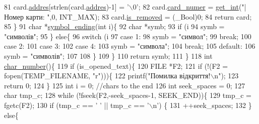 \begin{DoxyCodeInclude}
{{{{81     card.\hyperlink{structpatient__struct_a74e029a3ea6a1d9896abb9477f53dcf8}{addres}[strlen(card.\hyperlink{structpatient__struct_a74e029a3ea6a1d9896abb9477f53dcf8}{addres})-1] = \textcolor{charliteral}{'\(\backslash\)0'};
82     card.\hyperlink{structpatient__struct_a06e0e04046e9434904f4e53bb8583332}{card\_numer} = \hyperlink{lab__functions_8h_a45e2d75e7b00ac6711c815431d42bcfd}{get\_int}(\textcolor{stringliteral}{"|Номер карти: "},0, INT\_MAX);
83     card.\hyperlink{structpatient__struct_ad2475b69abfa9243c2700d63b63aa79b}{is\_removed} = (\_Bool)0;
84     \textcolor{keywordflow}{return} card;
85 \}
91 \textcolor{keywordtype}{char} *\hyperlink{main_8c_a7b977e9bdffd23deea96ed66e437ba5e}{symbol\_ending}(\textcolor{keywordtype}{int} i)\{
92     \textcolor{keywordtype}{char} *symb;
93     \textcolor{keywordflow}{if} (i%
94         symb = \textcolor{stringliteral}{"символів"};
95     \} \textcolor{keywordflow}{else}\{
96         \textcolor{keywordflow}{switch} (i%
97             \textcolor{keywordflow}{case} 1:
98                 symb = \textcolor{stringliteral}{"символ"};
99                 \textcolor{keywordflow}{break};
100             \textcolor{keywordflow}{case} 2:
101             \textcolor{keywordflow}{case} 3:
102             \textcolor{keywordflow}{case} 4:
103                 symb = \textcolor{stringliteral}{"символа"};
104                 \textcolor{keywordflow}{break};
105             \textcolor{keywordflow}{default}:
106                 symb = \textcolor{stringliteral}{"символів"};
107 
108         \}
109     \}
110     \textcolor{keywordflow}{return} symb;
111 \}
118 \textcolor{keywordtype}{int} \hyperlink{main_8c_a547313220292d7be671b208b68ab1d94}{char\_number}()\{
119     \textcolor{keywordflow}{if} (is\_opened\_text)\{
120         FILE *F2;
121         \textcolor{keywordflow}{if} (!(F2 = fopen(TEMP\_FILENAME, \textcolor{stringliteral}{"r"})))\{
122             printf(\textcolor{stringliteral}{"Помилка відкриття!\(\backslash\)n"});
123             \textcolor{keywordflow}{return} 0;
124         \}
125         \textcolor{keywordtype}{int} i = 0; \textcolor{comment}{//chars to the end}
126         \textcolor{keywordtype}{int} seek\_spaces = 0;
127         \textcolor{keywordtype}{char} tmp\_c;
128         \textcolor{keywordflow}{while} (!fseek(F2,-seek\_spaces-1, SEEK\_END))\{
129             tmp\_c = fgetc(F2);
130             \textcolor{keywordflow}{if} (tmp\_c == \textcolor{charliteral}{' '} || tmp\_c == \textcolor{charliteral}{'\(\backslash\)n'}) \{
131                 ++seek\_spaces;
132             \} \textcolor{keywordflow}{else}\{
}}}}
\end{DoxyCodeInclude}
